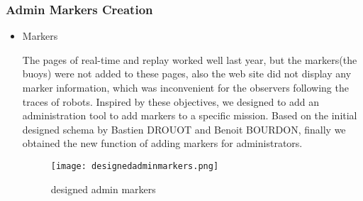 \subsubsection{Admin Markers Creation}
\begin{itemize}
\item{Markers}


The pages of real-time and replay worked well last year, but the markers(the buoys) were not added to these pages, also the web site did not display any marker information, which was inconvenient for the observers following the traces of robots. Inspired by these objectives, we designed to add an administration tool to add markers to a specific mission. Based on the initial designed schema by Bastien DROUOT and Benoit BOURDON, finally we obtained the new function of adding markers for administrators.
\begin{figure}[h!]
\centering
\texttt{[image: designedadminmarkers.png]}
\caption{designed admin markers }
\label{fig-sample}
\end{figure}


\end{itemize}
